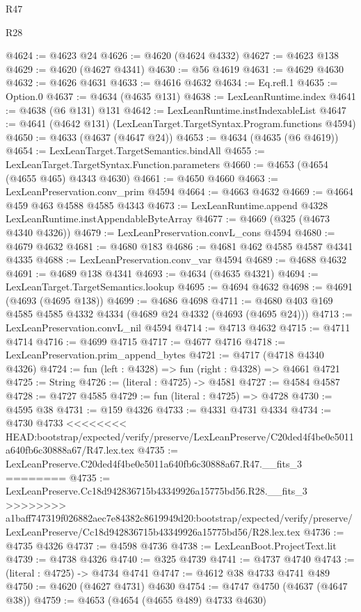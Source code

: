 \begin{lexlean}{R47}
\begin{lexlean}{R28}
\begin{coremodule}
{{{{{{{{{{{{{{{{{{{{{{{{{{{{{{{{{{{{{{{{{{{{{{{{{{{{{{{{{{{{{{{{{{{{{{{{{{{{{{{{{{{{{{{{{{{{{{{{{{{{{{{{{{{{{{{{{{{{{{{{{{{{{{{{{{{{{@4624 := @4623 @24
@4626 := @4620 (@4624 @4332)
@4627 := @4623 @138
@4629 := @4620 (@4627 @4341)
@4630 := @56 @4619
@4631 := @4629 @4630
@4632 := @4626 @4631
@4633 := @4616 @4632
@4634 := Eq.refl.{1}
@4635 := Option.{0}
@4637 := @4634 (@4635 @131)
@4638 := LexLeanRuntime.index
@4641 := @4638 (@6 @131) @131
@4642 := LexLeanRuntime.instIndexableList
@4647 := @4641 (@4642 @131) (LexLeanTarget.TargetSyntax.Program.functions @4594)
@4650 := @4633 (@4637 (@4647 @24))
@4653 := @4634 (@4635 (@6 @4619))
@4654 := LexLeanTarget.TargetSemantics.bindAll
@4655 := LexLeanTarget.TargetSyntax.Function.parameters
@4660 := @4653 (@4654 (@4655 @465) @4343 @4630)
@4661 := @4650 @4660
@4663 := LexLeanPreservation.conv_prim @4594
@4664 := @4663 @4632
@4669 := @4664 @459 @463 @4588 @4585 @4343
@4673 := LexLeanRuntime.append @4328 LexLeanRuntime.instAppendableByteArray
@4677 := @4669 (@325 (@4673 @4340 @4326))
@4679 := LexLeanPreservation.convL_cons @4594
@4680 := @4679 @4632
@4681 := @4680 @183
@4686 := @4681 @462 @4585 @4587 @4341 @4335
@4688 := LexLeanPreservation.conv_var @4594
@4689 := @4688 @4632
@4691 := @4689 @138 @4341
@4693 := @4634 (@4635 @4321)
@4694 := LexLeanTarget.TargetSemantics.lookup
@4695 := @4694 @4632
@4698 := @4691 (@4693 (@4695 @138))
@4699 := @4686 @4698
@4711 := @4680 @403 @169 @4585 @4585 @4332 @4334 (@4689 @24 @4332 (@4693 (@4695 @24)))
@4713 := LexLeanPreservation.convL_nil @4594
@4714 := @4713 @4632
@4715 := @4711 @4714
@4716 := @4699 @4715
@4717 := @4677 @4716
@4718 := LexLeanPreservation.prim_append_bytes
@4721 := @4717 (@4718 @4340 @4326)
@4724 := fun (left : @4328) => fun (right : @4328) => @4661 @4721
@4725 := String
@4726 := (literal : @4725) -> @4581
@4727 := @4584 @4587
@4728 := @4727 @4585
@4729 := fun (literal : @4725) => @4728
@4730 := @4595 @38
@4731 := @159 @4326
@4733 := @4331 @4731 @4334
@4734 := @4730 @4733
<<<<<<<< HEAD:bootstrap/expected/verify/preserve/LexLeanPreserve/C20ded4f4be0e5011a640fb6c30888a67/R47.lex.tex
@4735 := LexLeanPreserve.C20ded4f4be0e5011a640fb6c30888a67.R47.__fits_3
========
@4735 := LexLeanPreserve.Cc18d942836715b43349926a15775bd56.R28.__fits_3
>>>>>>>> a1baff747319f026882aec7e84382c8619949d20:bootstrap/expected/verify/preserve/LexLeanPreserve/Cc18d942836715b43349926a15775bd56/R28.lex.tex
@4736 := @4735 @4326
@4737 := @4598 @4736
@4738 := LexLeanBoot.ProjectText.lit
@4739 := @4738 @4326
@4740 := @325 @4739
@4741 := @4737 @4740
@4743 := (literal : @4725) -> @4734 @4741
@4747 := @4612 @38 @4733 @4741 @489
@4750 := @4620 (@4627 @4731) @4630
@4754 := @4747 @4750 (@4637 (@4647 @38))
@4759 := @4653 (@4654 (@4655 @489) @4733 @4630)
}}}}}}}}}}}}}}}}}}}}}}}}}}}}}}}}}}}}}}}}}}}}}}}}}}}}}}}}}}}}}}}}}}}}}}}}}}}}}}}}}}}}}}}}}}}}}}}}}}}}}}}}}}}}}}}}}}}}}}}}}}}}}}}}}}}}}
\end{coremodule}
\end{lexlean}
\end{lexlean}
